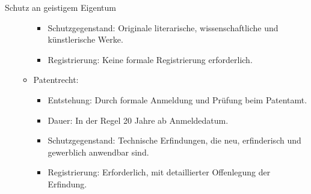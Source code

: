 \documentclass{article}
\begin{document}
\begin{exercise}{Schutz an geistigem Eigentum}
\begin{solution}
\begin{enumerate}
\begin{itemize}
\begin{itemize}
                      \item Schutzgegenstand: Originale literarische, wissenschaftliche und künstlerische Werke.
                      \item Registrierung: Keine formale Registrierung erforderlich.
                    \end{itemize}
              \item Patentrecht:
                    \begin{itemize}
                      \item Entstehung: Durch formale Anmeldung und Prüfung beim Patentamt.
                      \item Dauer: In der Regel 20 Jahre ab Anmeldedatum.
                      \item Schutzgegenstand: Technische Erfindungen, die neu, erfinderisch und gewerblich anwendbar sind.
                      \item Registrierung: Erforderlich, mit detaillierter Offenlegung der Erfindung.
                    \end{itemize}
            \end{itemize}
    \end{enumerate}
  \end{solution}
\end{exercise}
\end{document}
